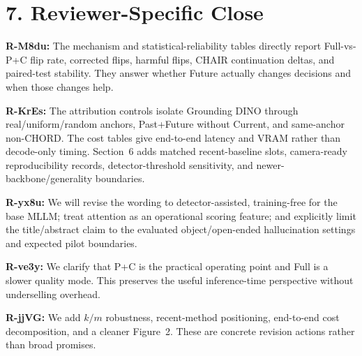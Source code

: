 \documentclass[10pt]{article}
\begin{document}
\section*{7. Reviewer-Specific Close}

\textbf{R-M8du:} The mechanism and statistical-reliability tables directly report Full-vs-P+C flip rate, corrected flips, harmful flips, CHAIR continuation deltas, and paired-test stability. They answer whether Future actually changes decisions and when those changes help.

\textbf{R-KrEs:} The attribution controls isolate Grounding DINO through real/uniform/random anchors, Past+Future without Current, and same-anchor non-CHORD. The cost tables give end-to-end latency and VRAM rather than decode-only timing. Section~6 adds matched recent-baseline slots, camera-ready reproducibility records, detector-threshold sensitivity, and newer-backbone/generality boundaries.

\textbf{R-yx8u:} We will revise the wording to detector-assisted, training-free for the base MLLM; treat attention as an operational scoring feature; and explicitly limit the title/abstract claim to the evaluated object/open-ended hallucination settings and expected pilot boundaries.

\textbf{R-ve3y:} We clarify that P+C is the practical operating point and Full is a slower quality mode. This preserves the useful inference-time perspective without underselling overhead.

\textbf{R-jjVG:} We add $k/m$ robustness, recent-method positioning, end-to-end cost decomposition, and a cleaner Figure~2. These are concrete revision actions rather than broad promises.
\end{document}
